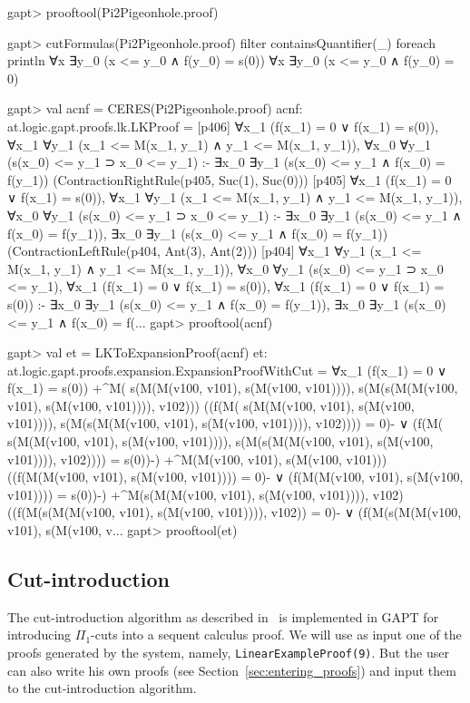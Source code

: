 \documentclass[a4paper,11pt]{article}
\begin{document}
\begin{clilisting}
gapt> prooftool(Pi2Pigeonhole.proof)

gapt> cutFormulas(Pi2Pigeonhole.proof) filter {containsQuantifier(_)} foreach println
∀x ∃y_0 (x <= y_0 ∧ f(y_0) = s(0))
∀x ∃y_0 (x <= y_0 ∧ f(y_0) = 0)

gapt> val acnf = CERES(Pi2Pigeonhole.proof)
acnf: at.logic.gapt.proofs.lk.LKProof =
[p406] ∀x_1 (f(x_1) = 0 ∨ f(x_1) = s(0)),
∀x_1 ∀y_1 (x_1 <= M(x_1, y_1) ∧ y_1 <= M(x_1, y_1)),
∀x_0 ∀y_1 (s(x_0) <= y_1 ⊃ x_0 <= y_1)
:-
∃x_0 ∃y_1 (s(x_0) <= y_1 ∧ f(x_0) = f(y_1))    (ContractionRightRule(p405, Suc(1), Suc(0)))
[p405] ∀x_1 (f(x_1) = 0 ∨ f(x_1) = s(0)),
∀x_1 ∀y_1 (x_1 <= M(x_1, y_1) ∧ y_1 <= M(x_1, y_1)),
∀x_0 ∀y_1 (s(x_0) <= y_1 ⊃ x_0 <= y_1)
:-
∃x_0 ∃y_1 (s(x_0) <= y_1 ∧ f(x_0) = f(y_1)),
∃x_0 ∃y_1 (s(x_0) <= y_1 ∧ f(x_0) = f(y_1))    (ContractionLeftRule(p404, Ant(3), Ant(2)))
[p404] ∀x_1 ∀y_1 (x_1 <= M(x_1, y_1) ∧ y_1 <= M(x_1, y_1)),
∀x_0 ∀y_1 (s(x_0) <= y_1 ⊃ x_0 <= y_1),
∀x_1 (f(x_1) = 0 ∨ f(x_1) = s(0)),
∀x_1 (f(x_1) = 0 ∨ f(x_1) = s(0))
:-
∃x_0 ∃y_1 (s(x_0) <= y_1 ∧ f(x_0) = f(y_1)),
∃x_0 ∃y_1 (s(x_0) <= y_1 ∧ f(x_0) = f(...
gapt> prooftool(acnf)

gapt> val et = LKToExpansionProof(acnf)
et: at.logic.gapt.proofs.expansion.ExpansionProofWithCut =
∀x_1 (f(x_1) = 0 ∨ f(x_1) = s(0))
  +^{M(
      s(M(M(v100, v101), s(M(v100, v101)))),
      s(M(s(M(M(v100, v101), s(M(v100, v101)))), v102)))}
    ((f(M(
            s(M(M(v100, v101), s(M(v100, v101)))),
            s(M(s(M(M(v100, v101), s(M(v100, v101)))), v102)))) =
        0)- ∨
      (f(M(
            s(M(M(v100, v101), s(M(v100, v101)))),
            s(M(s(M(M(v100, v101), s(M(v100, v101)))), v102)))) =
        s(0))-)
  +^{M(M(v100, v101), s(M(v100, v101)))}
    ((f(M(M(v100, v101), s(M(v100, v101)))) = 0)- ∨
      (f(M(M(v100, v101), s(M(v100, v101)))) = s(0))-)
  +^{M(s(M(M(v100, v101), s(M(v100, v101)))), v102)}
    ((f(M(s(M(M(v100, v101), s(M(v100, v101)))), v102)) = 0)- ∨
      (f(M(s(M(M(v100, v101), s(M(v100, v...
gapt> prooftool(et)

\end{clilisting}

\subsection{Cut-introduction}\label{sec.cut-introduction}

The cut-introduction algorithm as described in~\cite{Hetzl2012,Hetzl14Algorithmic,Hetzl14Introducing} is
implemented in GAPT for introducing $\Pi_1$-cuts into a sequent calculus
proof. We will use as input one of the proofs generated by
the system, namely, \texttt{LinearExampleProof(9)}. But the user can also
write his own proofs (see Section~\ref{sec:entering_proofs})
and input them to the cut-introduction algorithm.
\end{document}
